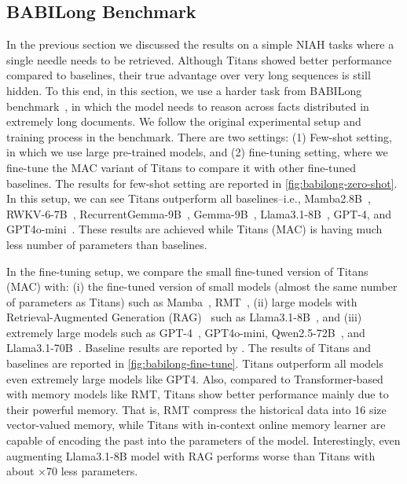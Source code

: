 \subsection{BABILong Benchmark}\label{sec:exp-babilong}
In the previous section we discussed the results on a simple NIAH tasks where a single needle needs to be retrieved. Although Titans showed better performance compared to baselines, their true advantage over very long sequences is still hidden. To this end, in this section, we use a harder task from BABILong benchmark~\citep{kuratov2024babilong}, in which the model needs to reason across facts distributed in extremely long documents. We follow the original experimental setup and training process in the benchmark. There are two settings: (1) Few-shot setting, in which we use large pre-trained models, and (2) fine-tuning setting, where we fine-tune the MAC variant of Titans to compare it with other fine-tuned baselines. The results for few-shot setting are reported in \autoref{fig:babilong-zero-shot}. In this setup, we can see Titans outperform all baselines–i.e., Mamba2.8B~\citep{gu2024mamba}, RWKV-6-7B~\citep{peng2024eagle}, RecurrentGemma-9B~\citep{botev2024recurrentgemma}, Gemma-9B~\citep{team2024gemma}, Llama3.1-8B~\citep{touvron2023llama}, GPT-4, and GPT4o-mini~\citep{achiam2023gpt}. These results are achieved while Titans (MAC) is having much less number of parameters than baselines. 


In the fine-tuning setup, we compare the small fine-tuned version of Titans (MAC) with: (i) the fine-tuned version of small models (almost the same number of parameters as Titans) such as Mamba~\citep{gu2024mamba}, RMT~\citep{bulatov2022recurrent}, (ii) large models with Retrieval-Augmented Generation (RAG)~\citep{lewis2020retrieval} such as Llama3.1-8B~\citep{touvron2023llama}, and (iii) extremely large models such as GPT-4~\citep{achiam2023gpt}, GPT4o-mini, Qwen2.5-72B~\citep{yang2024qwen2}, and Llama3.1-70B~\citep{touvron2023llama}. Baseline results are reported by \citep{kuratov2024babilong}. The results of Titans and baselines are reported in \autoref{fig:babilong-fine-tune}. Titans outperform all models even extremely large models like GPT4. Also, compared to Transformer-based with memory models like RMT, Titans show better performance mainly due to their powerful memory. That is, RMT compress the historical data into 16 size vector-valued memory, while Titans with in-context online memory learner are capable of encoding the past into the parameters of the model. Interestingly, even augmenting Llama3.1-8B model with RAG performs worse than Titans with about $\times$70 less parameters.       










